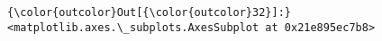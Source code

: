 \documentclass[11pt]{article}
\begin{document}
\begin{Verbatim}[commandchars=\\\{\}]
{\color{outcolor}Out[{\color{outcolor}32}]:} <matplotlib.axes.\_subplots.AxesSubplot at 0x21e895ec7b8>
\end{Verbatim}
            
    \begin{center}
    \end{center}
    { \hspace*{\fill} \\}
    
    \begin{center}
    \end{center}
    { \hspace*{\fill} \\}
    
    \begin{center}
    \end{center}
    { \hspace*{\fill} \\}
    

    
    
    
    
\end{document}
